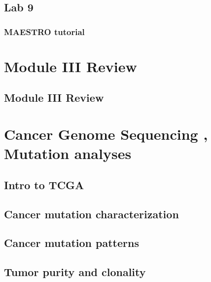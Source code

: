\documentclass[
]{book}
\begin{document}
\hypertarget{lab-9}{%
\section{Lab 9}\label{lab-9}}

\hypertarget{maestro-tutorial}{%
\subsection{MAESTRO tutorial}\label{maestro-tutorial}}

\hypertarget{m3re}{%
\chapter{Module III Review}\label{m3re}}

\hypertarget{module-iii-review}{%
\section{Module III Review}\label{module-iii-review}}

\hypertarget{cancerseq}{%
\chapter{Cancer Genome Sequencing , Mutation analyses}\label{cancerseq}}

\hypertarget{intro-to-tcga}{%
\section{Intro to TCGA}\label{intro-to-tcga}}

\hypertarget{cancer-mutation-characterization}{%
\section{Cancer mutation characterization}\label{cancer-mutation-characterization}}

\hypertarget{cancer-mutation-patterns}{%
\section{Cancer mutation patterns}\label{cancer-mutation-patterns}}

\hypertarget{tumor-purity-and-clonality}{%
\section{Tumor purity and clonality}\label{tumor-purity-and-clonality}}
\end{document}
